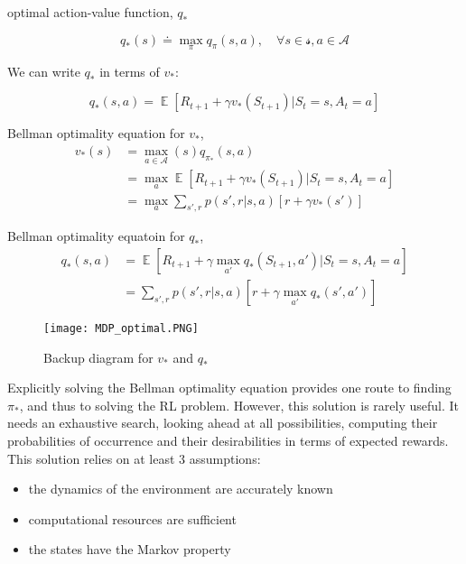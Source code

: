 \documentclass[lang=en,mode=geye,device=normal,color=blue,14pt]{elegantnote}
\DeclareMathOperator*{\E}{\mathbb{E}}
\DeclareMathOperator*{\1}{\mathbbm{1}}
\begin{document}
\begin{definition}
optimal action-value function, $q_*$

$$ q_*(s) \doteq \max_\pi q_\pi(s,a), \quad \forall s \in \mathcal{s}, a \in \mathcal{A} $$
\end{definition}

We can write $q_*$ in terms of $v_*$:

$$ q_*(s,a) = \E [R_{t+1} + \gamma v_* (S_{t+1}) | S_t = s, A_t = a] $$

\begin{definition}
Bellman optimality equation for $v_*$,
\begin{align*}
v_*(s) & = \max_{a\in\mathcal{A}}(s) q_{\pi_*} (s,a) \\
& = \max_a \E [R_{t+1} + \gamma v_* (S_{t+1}) | S_t = s, A_t = a] \\
& = \max_a \sum_{s',r} p(s',r|s,a)[r+\gamma v_*(s')]
\end{align*}
\end{definition}

\begin{definition}
Bellman optimality equatoin for $q_*$,
\begin{align*}
q_*(s,a) & = \E [R_{t+1} + \gamma \max_{a'} q_*(S_{t+1}, a') | S_t = s, A_t = a] \\
& = \sum_{s',r} p(s',r|s,a)[r+\gamma \max_{a'} q_*(s',a')]
\end{align*}
\end{definition}

\begin{figure}[!h]
  \centering
  \texttt{[image: MDP\_optimal.PNG]}
  \caption{Backup diagram for $v_*$ and $q_*$}
  \label{fig:MDP_optimal}
\end{figure}

Explicitly solving the Bellman optimality equation provides one route to finding $\pi_*$, and thus to solving the RL problem.
However, this solution is rarely useful. It needs an exhaustive search, looking ahead at all possibilities, computing their probabilities of occurrence and their desirabilities in terms of expected rewards.
This solution relies on at least 3 assumptions:
\begin{itemize}
\item the dynamics of the environment are accurately known
\item computational resources are sufficient
\item the states have the Markov property
\end{itemize}
\end{document}
